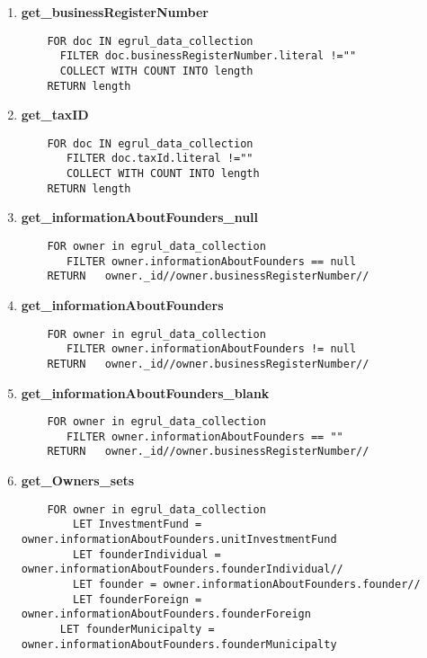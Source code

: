 
\label{appendix:a}


\begin{enumerate}
	\item \textbf{get\_businessRegisterNumber}\label{query1}
	\begin{verbatim}
	FOR doc IN egrul_data_collection
	  FILTER doc.businessRegisterNumber.literal !="" 
	  COLLECT WITH COUNT INTO length
	RETURN length
	\end{verbatim}
	
	\item \textbf{get\_taxID}\label{query2}
	\begin{verbatim}
	FOR doc IN egrul_data_collection
	   FILTER doc.taxId.literal !="" 
	   COLLECT WITH COUNT INTO length
	RETURN length
	\end{verbatim}
	
	\item \textbf{get\_informationAboutFounders\_null}\label{query3}
	\begin{verbatim}
	FOR owner in egrul_data_collection
	   FILTER owner.informationAboutFounders == null
	RETURN   owner._id//owner.businessRegisterNumber//
	\end{verbatim}
	
	\item \textbf{get\_informationAboutFounders}\label{query4}
	\begin{verbatim}
	FOR owner in egrul_data_collection
	   FILTER owner.informationAboutFounders != null
	RETURN   owner._id//owner.businessRegisterNumber//
	\end{verbatim}
	
	\item \textbf{get\_informationAboutFounders\_blank}\label{query5}
	\begin{verbatim}
	FOR owner in egrul_data_collection
	   FILTER owner.informationAboutFounders == ""
	RETURN   owner._id//owner.businessRegisterNumber//
	\end{verbatim}
	
	\item \textbf{get\_Owners\_sets}\label{query6}
	\begin{verbatim}
	FOR owner in egrul_data_collection
	    LET InvestmentFund = owner.informationAboutFounders.unitInvestmentFund
	    LET founderIndividual = owner.informationAboutFounders.founderIndividual//
	    LET founder = owner.informationAboutFounders.founder//
	    LET founderForeign = owner.informationAboutFounders.founderForeign
 	  LET founderMunicipalty = owner.informationAboutFounders.founderMunicipalty
 	    

\end{verbatim}
\end{enumerate}
